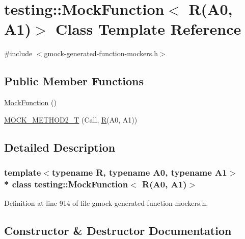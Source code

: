 \hypertarget{classtesting_1_1_mock_function_3_01_r_07_a0_00_01_a1_08_4}{}\section{testing\+:\+:Mock\+Function$<$ R(A0, A1)$>$ Class Template Reference}
\label{classtesting_1_1_mock_function_3_01_r_07_a0_00_01_a1_08_4}


{\ttfamily \#include $<$gmock-\/generated-\/function-\/mockers.\+h$>$}

\subsection*{Public Member Functions}
\begin{DoxyCompactItemize}
\item 
\hyperlink{classtesting_1_1_mock_function_3_01_r_07_a0_00_01_a1_08_4_a6a2575d43e9ec4f5d51cd53edbec7f82}{Mock\+Function} ()
\item 
\hyperlink{classtesting_1_1_mock_function_3_01_r_07_a0_00_01_a1_08_4_a5a4d673a3252cab866f0a4fa97486190}{M\+O\+C\+K\+\_\+\+M\+E\+T\+H\+O\+D2\+\_\+T} (Call, \hyperlink{typedefs__9_8js_afb423b73ee7b6c04d2d54fc06e405404}{R}(A0, A1))
\end{DoxyCompactItemize}


\subsection{Detailed Description}
\subsubsection*{template$<$typename R, typename A0, typename A1$>$\\*
class testing\+::\+Mock\+Function$<$ R(\+A0, A1)$>$}



Definition at line 914 of file gmock-\/generated-\/function-\/mockers.\+h.



\subsection{Constructor \& Destructor Documentation}
